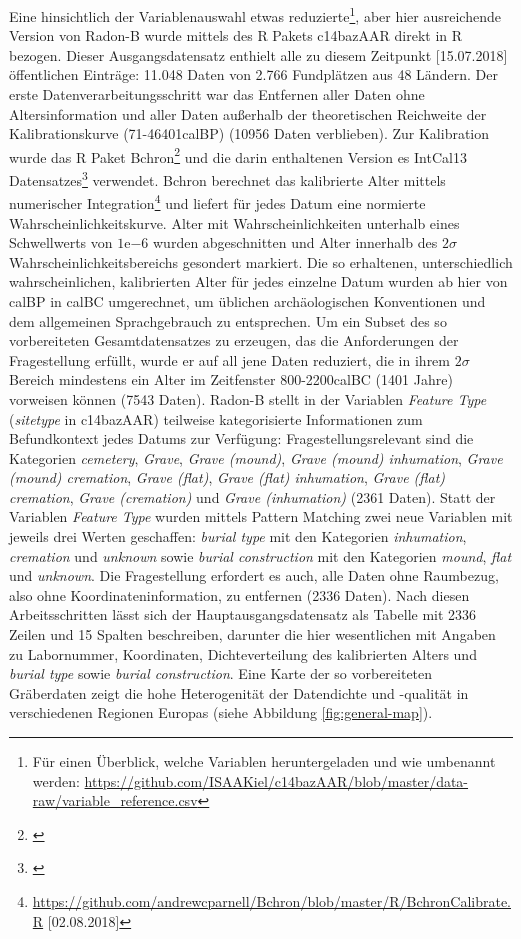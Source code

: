 \documentclass[openany,twoside,twocolumn]{book}
\let\rmarkdownfootnote\footnote%
\def\footnote{\protect\rmarkdownfootnote}
\begin{document}
Eine hinsichtlich der Variablenauswahl etwas reduzierte\footnote{Für einen Überblick, welche Variablen heruntergeladen und wie umbenannt werden: \url{https://github.com/ISAAKiel/c14bazAAR/blob/master/data-raw/variable_reference.csv}}, aber hier ausreichende Version von Radon-B wurde mittels des R Pakets c14bazAAR direkt in R bezogen. Dieser Ausgangsdatensatz enthielt alle zu diesem Zeitpunkt {[}15.07.2018{]} öffentlichen Einträge: 11.048 Daten von 2.766 Fundplätzen aus 48 Ländern. Der erste Datenverarbeitungsschritt war das Entfernen aller Daten ohne Altersinformation und aller Daten außerhalb der theoretischen Reichweite der Kalibrationskurve (71-46401calBP) (10956 Daten verblieben). Zur Kalibration wurde das R Paket Bchron\footnote{\textcite{haslett_simple_2008}} und die darin enthaltenen Version es IntCal13 Datensatzes\footnote{\textcite{reimer_intcal13_2013}} verwendet. Bchron berechnet das kalibrierte Alter mittels numerischer Integration\footnote{\url{https://github.com/andrewcparnell/Bchron/blob/master/R/BchronCalibrate.R} {[}02.08.2018{]}} und liefert für jedes Datum eine normierte Wahrscheinlichkeitskurve. Alter mit Wahrscheinlichkeiten unterhalb eines Schwellwerts von \(1\mathrm{e}{-6}\) wurden abgeschnitten und Alter innerhalb des \(2\sigma\) Wahrscheinlichkeitsbereichs gesondert markiert. Die so erhaltenen, unterschiedlich wahrscheinlichen, kalibrierten Alter für jedes einzelne Datum wurden ab hier von calBP in calBC umgerechnet, um üblichen archäologischen Konventionen und dem allgemeinen Sprachgebrauch zu entsprechen. Um ein Subset des so vorbereiteten Gesamtdatensatzes zu erzeugen, das die Anforderungen der Fragestellung erfüllt, wurde er auf all jene Daten reduziert, die in ihrem \(2\sigma\) Bereich mindestens ein Alter im Zeitfenster 800-2200calBC (1401 Jahre) vorweisen können (7543 Daten). Radon-B stellt in der Variablen \emph{Feature Type} (\emph{sitetype} in c14bazAAR) teilweise kategorisierte Informationen zum Befundkontext jedes Datums zur Verfügung: Fragestellungsrelevant sind die Kategorien \emph{cemetery}, \emph{Grave}, \emph{Grave (mound)}, \emph{Grave (mound) inhumation}, \emph{Grave (mound) cremation}, \emph{Grave (flat)}, \emph{Grave (flat) inhumation}, \emph{Grave (flat) cremation}, \emph{Grave (cremation)} und \emph{Grave (inhumation)} (2361 Daten). Statt der Variablen \emph{Feature Type} wurden mittels Pattern Matching zwei neue Variablen mit jeweils drei Werten geschaffen: \emph{burial type} mit den Kategorien \emph{inhumation}, \emph{cremation} und \emph{unknown} sowie \emph{burial construction} mit den Kategorien \emph{mound}, \emph{flat} und \emph{unknown}. Die Fragestellung erfordert es auch, alle Daten ohne Raumbezug, also ohne Koordinateninformation, zu entfernen (2336 Daten). Nach diesen Arbeitsschritten lässt sich der Hauptausgangsdatensatz als Tabelle mit 2336 Zeilen und 15 Spalten beschreiben, darunter die hier wesentlichen mit Angaben zu Labornummer, Koordinaten, Dichteverteilung des kalibrierten Alters und \emph{burial type} sowie \emph{burial construction}. Eine Karte der so vorbereiteten Gräberdaten zeigt die hohe Heterogenität der Datendichte und -qualität in verschiedenen Regionen Europas (siehe Abbildung \ref{fig:general-map}).
\end{document}
